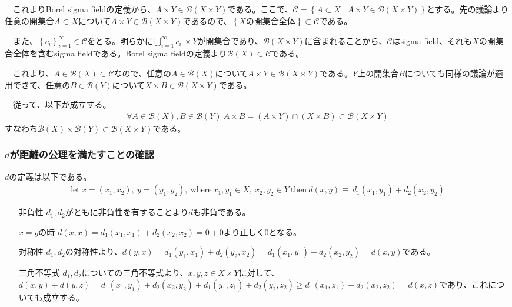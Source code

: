\documentclass{article}
\begin{document}
　これよりBorel sigma fieldの定義から、$A\times Y \in \mathcal{B}(X \times Y)$である。ここで、$\mathcal{C} = \left\{ A \subset X\mid A\times Y \in \mathcal{B}(X \times Y)\right\}$とする。先の議論より任意の開集合$A \subset X$について$A\times Y \in \mathcal{B}(X \times Y)$であるので、$\left\{ \text{$X$の開集合全体}\right\} \subset \mathcal{C}$である。

　また、$\left\{ c_i \right\}_{i=1}^{\infty} \in \mathcal{C}$をとる。明らかに$\bigcup_{i=1}^{\infty} c_i\ \times Y$が開集合であり、$\mathcal{B}(X\times Y)$に含まれることから、$\mathcal{C}$はsigma field、それも$X$の開集合全体を含むsigma fieldである。Borel sigma fieldの定義より$\mathcal{B}(X) \subset \mathcal{C}$である。

　これより、$A \in \mathcal{B}(X)\subset \mathcal{C}$なので、任意の$A\in \mathcal{B}(X)$について$A\times Y \in \mathcal{B}(X\times Y)$である。$Y$上の開集合$B$についても同様の議論が適用できて、任意の$B\in \mathcal{B}(Y)$について$X\times B\in \mathcal{B}(X\times Y)$である。

　従って、以下が成立する。
\begin{align*}
	\forall A\in\mathcal{B}(X), B \in \mathcal{B}(Y)\ A\times B = (A\times Y) \cap (X\times B) \subset \mathcal{B}(X\times Y)
\end{align*}
すなわち$\mathcal{B}(X)\times\mathcal{B}(Y) \subset \mathcal{B}(X\times Y)$である。

\subsubsection{$d$が距離の公理を満たすことの確認}
$d$の定義は以下である。
\begin{align*}
	\text{let}\ x = (x_1, x_2),\ y = (y_1,y_2),\ \text{where}\ x_1,y_1\in X,\ x_2,y_2\in Y\ \text{then}\ d(x,y) \equiv\ d_1(x_1,y_1)+d_2(x_2,y_2)
\end{align*}
\begin{itemize}
	\item[非負性] $d_1, d_2$がともに非負性を有することより$d$も非負である。
	\item[$x = y$の時] $d(x, x) = d_1(x_1,x_1) + d_2(x_2,x_2) = 0 + 0$より正しく$0$となる。
	\item[対称性] $d_1,d_2$の対称性より、$d(y, x) = d_1(y_1,x_1) + d_2(y_2,x_2) = d_1(x_1,y_1)+d_2(x_2,y_2) = d(x, y)$である。
	\item[三角不等式] $d_1,d_2$についての三角不等式より、$x, y, z \in X\times Y$に対して、$d(x,y) + d(y, z) = d_1(x_1,y_1)+d_2(x_2,y_2) + d_1(y_1,z_1)+d_2(y_2,z_2) \geq d_1(x_1, z_1) + d_2(x_2,z_2) = d(x,z)$であり、これについても成立する。
\end{itemize}
\end{document}

